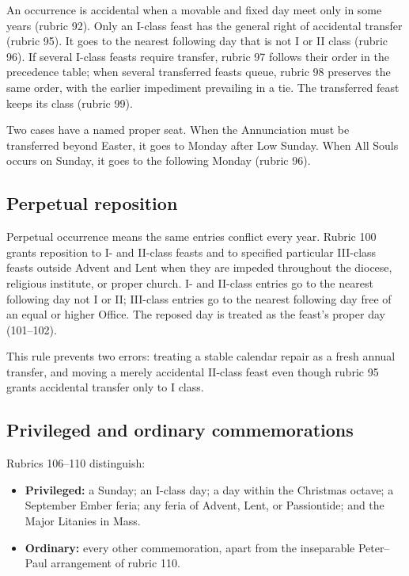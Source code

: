 An occurrence is accidental when a movable and fixed day meet only in some years (rubric 92). Only an I-class feast has the general right of accidental transfer (rubric 95). It goes to the nearest following day that is not I or II class (rubric 96). If several I-class feasts require transfer, rubric 97 follows their order in the precedence table; when several transferred feasts queue, rubric 98 preserves the same order, with the earlier impediment prevailing in a tie. The transferred feast keeps its class (rubric 99).

Two cases have a named proper seat. When the Annunciation must be transferred beyond Easter, it goes to Monday after Low Sunday. When All Souls occurs on Sunday, it goes to the following Monday (rubric 96).

\subsection{Perpetual reposition}

Perpetual occurrence means the same entries conflict every year. Rubric 100 grants reposition to I- and II-class feasts and to specified particular III-class feasts outside Advent and Lent when they are impeded throughout the diocese, religious institute, or proper church. I- and II-class entries go to the nearest following day not I or II; III-class entries go to the nearest following day free of an equal or higher Office. The reposed day is treated as the feast's proper day (101--102).

This rule prevents two errors: treating a stable calendar repair as a fresh annual transfer, and moving a merely accidental II-class feast even though rubric 95 grants accidental transfer only to I class.

\subsection{Privileged and ordinary commemorations}

Rubrics 106--110 distinguish:

\begin{itemize}
\item \textbf{Privileged:} a Sunday; an I-class day; a day within the Christmas octave; a September Ember feria; any feria of Advent, Lent, or Passiontide; and the Major Litanies in Mass.
\item \textbf{Ordinary:} every other commemoration, apart from the inseparable Peter--Paul arrangement of rubric 110.
\end{itemize}

